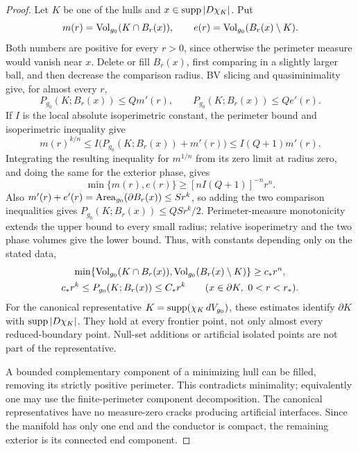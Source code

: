\begin{proof}
Let $K$ be one of the hulls and
$x\in\operatorname{supp}|D\chi_K|$. Put
\[
 m(r)=\operatorname{Vol}_{g_0}(K\cap B_r(x)),\qquad
 e(r)=\operatorname{Vol}_{g_0}(B_r(x)\setminus K).
\]
Both numbers are positive for every $r>0$, since otherwise the
perimeter measure would vanish near $x$. Delete or fill $B_r(x)$,
first comparing in a slightly larger ball, and then decrease the
comparison radius. BV slicing and quasiminimality give, for
almost every $r$,
\[
 P_{g_0}(K;B_r(x))\le Qm'(r),\qquad
 P_{g_0}(K;B_r(x))\le Qe'(r).
\]
If $I$ is the local absolute isoperimetric constant, the perimeter
bound and isoperimetric inequality give
\[
 m(r)^{k/n}\le I\bigl(P_{g_0}(K;B_r(x))+m'(r)\bigr)
 \le I(Q+1)m'(r).
\]
Integrating the resulting inequality for $m^{1/n}$ from its zero
limit at radius zero, and doing the same for the exterior phase,
gives
\[
 \min\{m(r),e(r)\}\ge[nI(Q+1)]^{-n}r^n.
\]
Also $m'(r)+e'(r)=\operatorname{Area}_{g_0}(\partial B_r(x))\le Sr^k$,
so adding the two comparison inequalities gives
$P_{g_0}(K;B_r(x))\le QS r^k/2$. Perimeter-measure
monotonicity extends the upper bound to every small radius;
relative isoperimetry and the two phase volumes give the lower
bound. Thus, with constants depending only on the stated data,
\begin{equation}
\label{eq:rpi:flow-density-input}
 \begin{gathered}
 \min\{\operatorname{Vol}_{g_0}(K\cap B_r(x)),
          \operatorname{Vol}_{g_0}(B_r(x)\setminus K)\}\ge c_* r^n,\\
 c_* r^k\le P_{g_0}(K;B_r(x))\le C_* r^k
 \qquad(x\in\partial K,\ 0<r<r_*).
 \end{gathered}
\end{equation}
For the canonical representative $K=\operatorname{supp}(\chi_K\,dV_{g_0})$,
these estimates identify $\partial K$ with
$\operatorname{supp}|D\chi_K|$. They hold at every frontier point, not only
almost every reduced-boundary point. Null-set additions or
artificial isolated points are not part of the representative.

A bounded complementary component of a minimizing hull can be
filled, removing its strictly positive perimeter. This contradicts
minimality; equivalently one may use the finite-perimeter
component decomposition. The canonical representatives have no
measure-zero cracks producing artificial interfaces. Since the
manifold has only one end and the conductor is compact, the
remaining exterior is its connected end component.


\end{proof}
